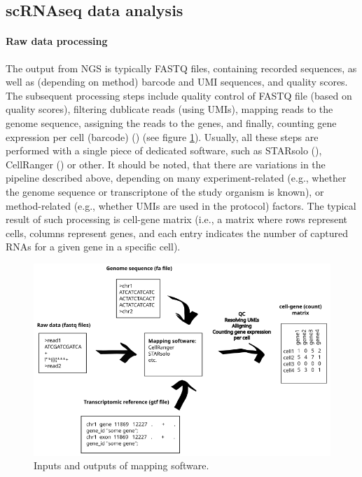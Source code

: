 \subsection{scRNAseq data analysis}

\paragraph{Raw data processing}

The output from NGS is typically FASTQ files, containing recorded sequences,
as well as (depending on method) barcode and UMI sequences, and quality scores.
The subsequent processing steps include quality control of FASTQ file (based on quality scores),
filtering dublicate reads (using UMIs), mapping reads to the genome sequence, assigning the reads to the genes,
and finally, counting gene expression per cell (barcode) (\cite{Heumos2023}) (see figure \ref{fig:rawData}).
Usually, all these steps are performed with a single piece of dedicated software,
such as STARsolo (\cite{Kaminow2021}), CellRanger (\cite{Zheng2017}) or other.
It should be noted, that there are variations in the pipeline described above,
depending on many experiment-related (e.g., whether the genome sequence or transcriptone of the study organism is known),
or method-related (e.g., whether UMIs are used in the protocol) factors.
The typical result of such processing is cell-gene matrix (i.e., a matrix where rows represent cells,
columns represent genes, and each entry indicates the number of captured RNAs for a given gene in a specific cell).

\begin{figure}
  \centering
  \includegraphics[width=\linewidth]{images/rawdata.png}
  \caption{Inputs and outputs of mapping software.}
  \label{fig:rawData}
\end{figure}

